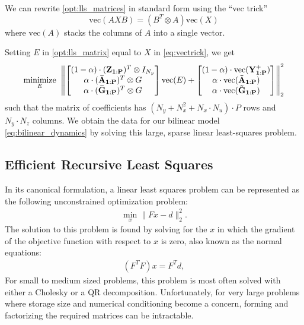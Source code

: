 \documentclass{article}
\begin{document}
We can rewrite \eqref{opt:lls_matrices} in standard form using the ``vec trick''
\begin{equation} \label{eq:vectrick}
  \text{vec}(A X B) = (B^T \otimes A) \text{vec}(X)
\end{equation}
where $\text{vec}(A)$ stacks the columns of $A$ into a single vector.

Setting $E$ in \eqref{opt:lls_matrix} equal to $X$ in \eqref{eq:vectrick}, we get
\begin{align} \label{opt:lls_matrix}
  \underset{E}{\text{minimize}} \;\;  
  \norm{
  \begin{bmatrix}
    (1-\alpha)\cdot(\mathbf{Z_{1:P}})^T \otimes I_{N_y} \\
    \alpha\cdot(\mathbf{\bar{A}_{1:P}})^T \otimes G \\
    \alpha\cdot(\mathbf{\bar{G}_{1:P}})^T \otimes G \\
  \end{bmatrix}
  \text{vec}(E)
  +
  \begin{bmatrix}
    (1-\alpha)\cdot\text{vec}(\mathbf{Y^+_{1:P}}) \\
    \alpha\cdot\text{vec}(\mathbf{\tilde{A}_{1:P}}) \\
    \alpha\cdot\text{vec}(\mathbf{\tilde{G}_{1:P}})
  \end{bmatrix}
  }_2^2
\end{align}
such that the matrix of coefficients has $(N_y + N_x^2 + N_x \cdot N_u) \cdot P$ rows and 
$N_y \cdot N_z$ columns. We obtain the data for our bilinear model 
\eqref{eq:bilinear_dynamics} by solving this large, sparse linear least-squares 
problem.

\subsection{Efficient Recursive Least Squares} \label{sec:rls}
In its canonical formulation, a linear least squares problem can be represented as the
following unconstrained optimization problem:
\begin{align}
  \min_x \|Fx - d\|_2^2.
\end{align}
The solution to this problem is found by solving for the $x$ in which the gradient of the
objective function with respect to $x$ is zero, also known as the normal equations: 
\begin{align}\label{eq:normal_eq}
  (F^TF)x =F^Td,
\end{align}
For small to medium sized problems, this problem is most often solved with either a Cholesky
or a QR decomposition.  Unfortunately, for very large problems where storage size and
numerical conditioning become a concern, forming and factorizing the required matrices can
be intractable.
\end{document}
